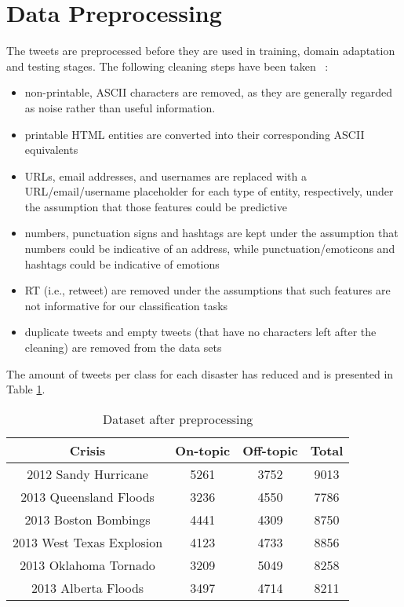 \section{Data Preprocessing}
\label{datapreprocessing}

The tweets are preprocessed before they are used in training, domain adaptation and testing stages.
The following cleaning steps have been taken ~\citep{twitterda}:

\begin{itemize}
  \item non-printable, ASCII characters are removed, as they are generally regarded as noise rather than useful information.
  \item printable HTML entities are converted into their corresponding ASCII equivalents
  \item URLs, email addresses, and usernames are replaced with a URL/email/username placeholder for each type of entity, respectively, under the assumption that those features could be predictive 
  \item numbers, punctuation signs and hashtags are kept under the assumption that numbers could be indicative of an address, while punctuation/emoticons and hashtags could be indicative of emotions 
  \item RT (i.e., retweet) are removed under the assumptions that such features are not informative for our classification tasks
  \item duplicate tweets and empty tweets (that have no characters left after the cleaning) are removed from the data sets
\end{itemize}

The amount of tweets per class for each disaster has reduced and is presented in Table \ref{aftercleaningdatasettable}.

\begin{table}[ht]
    \begin{center}
    \caption{Dataset after preprocessing}
    \begin{tabular}[c]{|c|c|c|c|}
        \hline
        Crisis & On-topic & Off-topic & Total \\
        \hline
        2012 Sandy Hurricane & 5261 & 3752 & 9013 \\
        2013 Queensland Floods & 3236 & 4550 & 7786 \\ 
        2013 Boston Bombings & 4441 & 4309 & 8750 \\ 
        2013 West Texas Explosion & 4123 & 4733 & 8856 \\
        2013 Oklahoma Tornado & 3209 & 5049 & 8258 \\
        2013 Alberta Floods & 3497 & 4714 & 8211 \\
        \hline
    \end{tabular}
    \label{aftercleaningdatasettable}
   \end{center}
\end{table}

